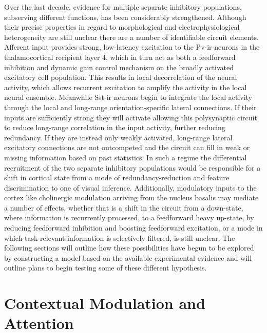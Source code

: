 Over the last decade, evidence for multiple separate inhibitory
populations, subserving different functions, has been considerably
strengthened. Although their precise properties in regard to
morphological and electrophysiological heterogeneity are still unclear
there are a number of identifiable circuit elements. Afferent input
provides strong, low-latency excitation to the Pv-ir neurons in the
thalamocortical recipient layer 4, which in turn act as both a
feedforward inhibition and dynamic gain control mechanism on the
broadly activated excitatory cell population. This results in local
decorrelation of the neural activity, which allows recurrent
excitation to amplify the activity in the local neural
ensemble. Meanwhile Sst-ir neurons begin to integrate the local
activity through the local and long-range orientation-specific lateral
connections. If their inputs are sufficiently strong they will
activate allowing this polysynaptic circuit to reduce long-range
correlation in the input activity, further reducing redundancy. If
they are instead only weakly activated, long-range lateral
excitatory connections are not outcompeted and the circuit can fill in
weak or missing information based on past statistics. In such a
regime the differential recruitment of the two separate inhibitory
populations would be responsible for a shift in cortical state from a
mode of redundancy-reduction and feature discrimination to one of
visual inference. Additionally, modulatory inputs to the cortex like
cholinergic modulation arriving from the nucleus basalis may mediate a
number of effects, whether that is a shift in the circuit from a
down-state, where information is recurrently processed, to a
feedforward heavy up-state, by reducing feedforward inhibition and
boosting feedforward excitation, or a mode in which task-relevant
information is selectively filtered, is still unclear. The following
sections will outline how these possibilities have begun to be
explored by constructing a model based on the available experimental
evidence and will outline plans to begin testing some of these
different hypothesis.

\section{Contextual Modulation and Attention} \label{contextualmodulation}

